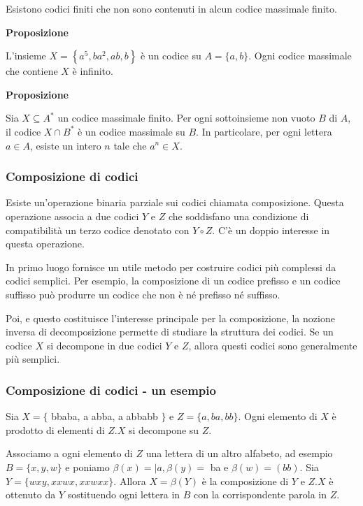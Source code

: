 Esistono codici finiti che non sono contenuti in alcun codice massimale finito.

\vspace{5mm}

\textbf{Proposizione}

L'insieme $X=\left\{a^{5}, b a^{2}, a b, b\right\}$ è un codice su $A=\{a, b\} .$ Ogni codice massimale che contiene $X$ è infinito.

\vspace{5mm}

\textbf{Proposizione}

Sia $X \subseteq A^{*}$ un codice massimale finito. Per ogni sottoinsieme non vuoto $B$ di $A$, il codice $X \cap B^{*}$ è un codice massimale su $B$.
In particolare, per ogni lettera $a \in A$, esiste un intero $n$ tale che $a^{n} \in X$.

\subsubsection{Composizione di codici}

Esiste un'operazione binaria parziale sui codici chiamata composizione. Questa operazione associa a due codici $Y$ e $Z$ che soddisfano una condizione di compatibilità un terzo codice denotato con $Y \circ Z$.
C'è un doppio interesse in questa operazione.

\vspace{5mm}

In primo luogo fornisce un utile metodo per costruire codici più complessi da codici semplici. Per esempio, la composizione di un codice prefisso e un codice suffisso può produrre un codice che non è né prefisso né suffisso.

Poi, e questo costituisce l'interesse principale per la composizione, la nozione inversa di decomposizione permette di studiare la struttura dei codici. Se un codice $X$ si decompone in due codici $Y$ e $Z$, allora questi codici sono generalmente più semplici.

\subsubsection{Composizione di codici - un esempio}

Sia $X=\{$ bbaba, a abba, a abbabb $\}$ e $Z=\{a, b a, b b\} .$
Ogni elemento di $X$ è prodotto di elementi di $Z . X$ si decompone su $Z$.

Associamo a ogni elemento di $Z$ una lettera di un altro alfabeto, ad esempio $B=\{x, y, w\}$ e poniamo $\beta(x)=\mid a, \beta(y)=$ ba e $\beta(w)=(b b) .$
Sia $Y=\{w x y, x x w x, x x w x x\} .$ Allora $X=\beta(Y)$ è la composizione di $Y$ e $Z . X$ è ottenuto da $Y$ sostituendo ogni lettera in $B$ con la corrispondente parola in $Z$.

